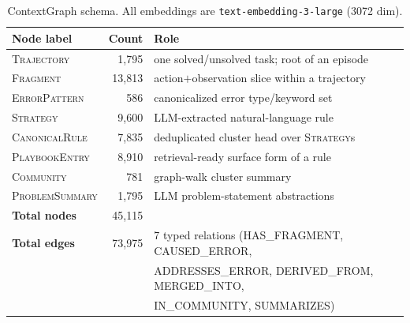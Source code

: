 
\begin{table}[t]
\centering
\caption{ContextGraph schema. All embeddings are \texttt{text-embedding-3-large} (3072 dim).}
\label{tab:schema}
\small
\begin{tabular}{lrl}
\toprule
\textbf{Node label} & \textbf{Count} & \textbf{Role} \\
\midrule
\textsc{Trajectory} & 1{,}795 & one solved/unsolved task; root of an episode \\
\textsc{Fragment} & 13{,}813 & action$+$observation slice within a trajectory \\
\textsc{ErrorPattern} & 586 & canonicalized error type/keyword set \\
\textsc{Strategy} & 9{,}600 & LLM-extracted natural-language rule \\
\textsc{CanonicalRule} & 7{,}835 & deduplicated cluster head over \textsc{Strategy}s \\
\textsc{PlaybookEntry} & 8{,}910 & retrieval-ready surface form of a rule \\
\textsc{Community} & 781 & graph-walk cluster summary \\
\textsc{ProblemSummary} & 1{,}795 & LLM problem-statement abstractions \\
\midrule
\textbf{Total nodes} & 45{,}115 & \\
\textbf{Total edges} & 73{,}975 & 7 typed relations (\textsc{HAS\_FRAGMENT}, \textsc{CAUSED\_ERROR}, \\
& & \textsc{ADDRESSES\_ERROR}, \textsc{DERIVED\_FROM}, \textsc{MERGED\_INTO}, \\
& & \textsc{IN\_COMMUNITY}, \textsc{SUMMARIZES}) \\
\bottomrule
\end{tabular}
\end{table}

